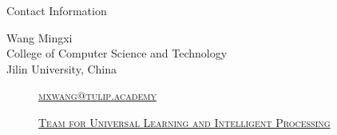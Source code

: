 \documentclass[
 size=14pt,
 paper=smartboard,  %
 mode=present, 		%
 display=slides, 	%
 style=tuliplab,  	%
 pauseslide,
 fleqn,leqno]{powerdot}
\begin{document}






\begin{wideslide}[toc=,bm=]{Contact Information}
\centering
{}
\twocolumn[
lcolwidth=0.35\linewidth,
rcolwidth=0.65\linewidth
]
{
}
{
Wang Mingxi\\
College of Computer Science and Technology\\
Jilin University, China
\begin{description}
 \item[\textcolor{orange}{\faEnvelope}] \href{mailto:mxwang@tulip.academy}
 {\textsc{\footnotesize{mxwang@tulip.academy}}}

 \item[\textcolor{orange}{\faHome}] \href{http://www.tulip.org.au}
 {\textsc{\footnotesize{Team for Universal Learning and Intelligent Processing}}}
\end{description}
}
\end{wideslide}
\end{document}
